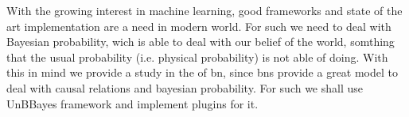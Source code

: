  With the growing interest in machine learning, good frameworks and state of the art implementation are a need in modern world. For such we need to deal with Bayesian probability, wich is able to deal with our belief of the world, somthing that the usual probability (i.e. physical probability) is not able of doing. With this in mind we provide a study in the of \gls{bn}, since \glspl{bn} provide a great model to deal with causal relations and bayesian probability. For such we shall use UnBBayes framework and implement plugins for it.
  